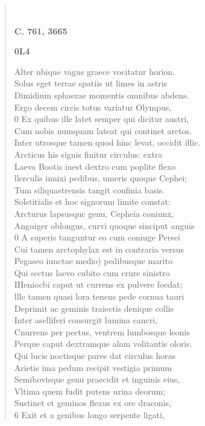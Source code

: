 \documentclass[11pt, a4paper]{report}
\begin{document}
\begin{verse}
        ﻿\pagebreak 
    \begin{center} \textbf{C. 761, 3665} \end{center} \marginpar{[245]} \begin{center} \textbf{0L4} \end{center}Alter ubique vagus graece vocitatur horion. \\ Solus eget terrae spatiis ut limes in astris \\ Dimidium sphaerae momentis omnibus abdens. \\ Ergo decem circis totus variatur Olympus, \\ 0 Ex quibus ille latet semper qui dicitur austri, \\ Cum nobis numquam lateat qui continet arctos. \\ Inter utrosque tamen quod hinc levat, occidit illic. \\ Arcticus his signis finitur circulus: extra \\ Laeva Bootis inest dextro cum poplite flexo \\ llerculis innixi pedibus, umeris quoque Cephei; \\ Tum siliquastrensis tangit confinia basis. \\ Solstitialis et hoc signorum limite constat: \\ Arcturus lapsusquc genu, Cepheia coniunx, \\ Anguiger oblongus, curvi quoque sinciput anguis \\ 0 A superis tanguntur eo cum coniuge Persei \\  \lbrack Cui tamen arctophylax est in contraria versus \\ Pegaseo iunctae medio) pedibusque marito \\ Qui sectus laevo cubito cum crure sinistro \\ IHeniocbi caput ut currens ex pulvere foedat; \\ llle tamen quasi lora tenens pede cornua tauri \\ Deprimit ac geminis traiectis denique collis \\ Inter aselliferi consurgit lumina cancri, \\ Cnurrens per pectus, ventrem lumbosque leonis \\ Perque caput dextramque alam volitantis oloris. \\ Qui lucis noctisque pares dat circulus horas \\ Arietis ima pedum recipit vestigia primum \\ Semibovisque genu praecidit et inguinis eius, \\ Vltima quem fudit putens urina deorum; \\ Sustinet et geminos flexus ex ore draconis, \\ 6 Exit et a genibus longo serpente ligati, \\ 

\end{verse}
\end{document}
